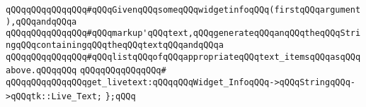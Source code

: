 \newline
\verb|qQQqqQQqqQQqqQQq#qQQqGivenqQQqsomeqQQqwidgetinfoqQQq(firstqQQqargument),qQQqandqQQqa|\newline
\verb|qQQqqQQqqQQqqQQq#qQQqmarkup'qQQqtext,qQQqgenerateqQQqanqQQqtheqQQqStringqQQqcontainingqQQqtheqQQqtextqQQqandqQQqa|\newline
\verb|qQQqqQQqqQQqqQQq#qQQqlistqQQqofqQQqappropriateqQQqtext_itemsqQQqasqQQqabove.qQQqqQQq|\newline
\verb|qQQqqQQqqQQqqQQq#|\newline
\verb|qQQqqQQqqQQqqQQqget_livetext:qQQqqQQqWidget_InfoqQQq->qQQqStringqQQq->qQQqtk::Live_Text;|\newline
\verb|};qQQq|\newline
\newline
\newline
\newline
\newline
\newline
\newline

